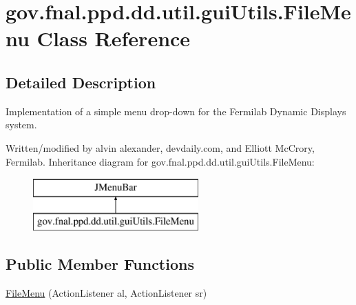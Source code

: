 \hypertarget{classgov_1_1fnal_1_1ppd_1_1dd_1_1util_1_1guiUtils_1_1FileMenu}{\section{gov.\-fnal.\-ppd.\-dd.\-util.\-gui\-Utils.\-File\-Menu Class Reference}
\label{classgov_1_1fnal_1_1ppd_1_1dd_1_1util_1_1guiUtils_1_1FileMenu}
}


\subsection{Detailed Description}
Implementation of a simple menu drop-\/down for the Fermilab Dynamic Displays system.

Written/modified by alvin alexander, devdaily.\-com, and Elliott Mc\-Crory, Fermilab. Inheritance diagram for gov.\-fnal.\-ppd.\-dd.\-util.\-gui\-Utils.\-File\-Menu\-:\begin{figure}[H]
\begin{center}
\leavevmode
\includegraphics[height=2.000000cm]{classgov_1_1fnal_1_1ppd_1_1dd_1_1util_1_1guiUtils_1_1FileMenu}
\end{center}
\end{figure}
\subsection*{Public Member Functions}
\begin{DoxyCompactItemize}
\item 
\hyperlink{classgov_1_1fnal_1_1ppd_1_1dd_1_1util_1_1guiUtils_1_1FileMenu_a1f837a05041451ddfa13a6a8f84ceaab}{File\-Menu} (Action\-Listener al, Action\-Listener sr)
\end{DoxyCompactItemize}
